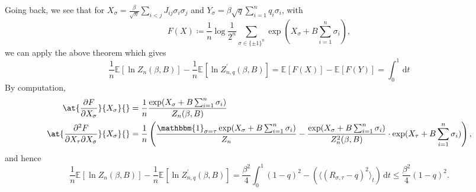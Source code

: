 Going back, we see that for \(X_\sigma = \frac{\beta }{\sqrt{n} } \sum_{i < j} J_{ij} \sigma _i \sigma _j\) and \(Y_\sigma = \beta \sqrt{q} \sum_{i=1}^{n} q_i \sigma _i\), with
\[
	F(X)
	\coloneqq \frac{1}{n} \log \frac{1}{2^n} \sum_{\sigma \in \{ \pm 1 \} ^n} \exp (X_\sigma + B \sum_{i=1}^{n} \sigma _i),
\]
we can apply the above theorem which gives
\[
	\frac{1}{n} \mathbb{E}_{}[\ln Z_n(\beta , B)] - \frac{1}{n} \mathbb{E}_{}[\ln Z_{n, q}^{\prime} (\beta , B)]
	= \mathbb{E}_{}[F(X)] - \mathbb{E}_{}[F(Y)]
	= \int_{0}^{1}  \,\mathrm{d}t
\]
By computation,
\[
	\begin{split}
		\at{\frac{\partial F}{\partial X_\sigma } }{X_\sigma }{}
		 & = \frac{1}{n} \frac{\exp (X_\sigma + B \sum_{i=1}^{n} \sigma _i)}{Z_n(\beta , B)}                                                                                                                                                           \\
		\at{\frac{\partial ^2 F}{\partial X_\tau \partial X_\sigma } }{X_\sigma }{}
		 & = \frac{1}{n} \left( \frac{\mathbbm{1}_{\sigma = \tau } \exp (X_\sigma + B \sum_{i=1}^{n} \sigma _i)}{Z_n} - \frac{\exp (X_\sigma + B \sum_{i=1}^{n} \sigma _i)}{Z_n^2(\beta , B)} \cdot \exp (X_\tau + B \sum_{i=1}^{n} \sigma _i)\right),
	\end{split}
\]
and hence
\[
	\frac{1}{n} \mathbb{E}_{}[\ln Z_n(\beta , B)] - \frac{1}{n} \mathbb{E}_{}[\ln Z_{n, q}^{\prime} (\beta , B)]
	= \frac{\beta ^2}{4} \int_{0}^{1} (1 - q)^2 - (\langle (R_{\sigma , \tau } - q)^2 \rangle _t ) \,\mathrm{d}t
	\leq \frac{\beta ^2}{4} (1 - q)^2.
\]